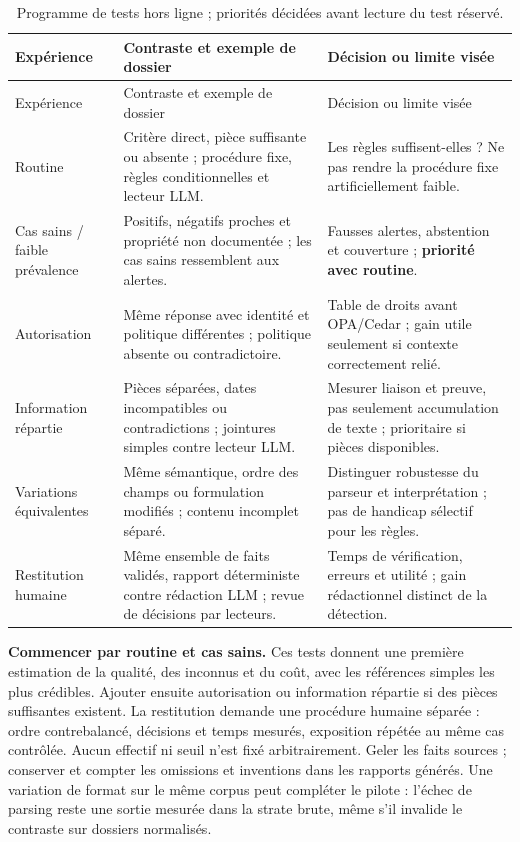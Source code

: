 \documentclass[11pt,a4paper]{article}
\begin{document}
\begin{longtable}{>{\raggedright\arraybackslash}p{25mm}>{\raggedright\arraybackslash}p{65mm}>{\raggedright\arraybackslash}p{52mm}}
\caption{Programme de tests hors ligne ; priorités décidées avant lecture du test réservé.}\label{tab:tests}\\
\toprule
Expérience & Contraste et exemple de dossier & Décision ou limite visée\\
\midrule\endfirsthead
\toprule Expérience & Contraste et exemple de dossier & Décision ou limite visée\\\midrule\endhead
Routine & Critère direct, pièce suffisante ou absente ; procédure fixe, règles conditionnelles et lecteur LLM. & Les règles suffisent-elles ? Ne pas rendre la procédure fixe artificiellement faible.\\
Cas sains / faible prévalence & Positifs, négatifs proches et propriété non documentée ; les cas sains ressemblent aux alertes. & Fausses alertes, abstention et couverture ; \textbf{priorité avec routine}.\\
Autorisation & Même réponse avec identité et politique différentes ; politique absente ou contradictoire. & Table de droits avant OPA/Cedar ; gain utile seulement si contexte correctement relié.\\
Information répartie & Pièces séparées, dates incompatibles ou contradictions ; jointures simples contre lecteur LLM. & Mesurer liaison et preuve, pas seulement accumulation de texte ; prioritaire si pièces disponibles.\\
Variations équivalentes & Même sémantique, ordre des champs ou formulation modifiés ; contenu incomplet séparé. & Distinguer robustesse du parseur et interprétation ; pas de handicap sélectif pour les règles.\\
Restitution humaine & Même ensemble de faits validés, rapport déterministe contre rédaction LLM ; revue de décisions par lecteurs. & Temps de vérification, erreurs et utilité ; gain rédactionnel distinct de la détection.\\
\bottomrule
\end{longtable}

\textbf{Commencer par routine et cas sains.} Ces tests donnent une première
estimation de la qualité, des inconnus et du coût, avec les références simples
les plus crédibles. Ajouter ensuite autorisation ou information répartie
si des pièces suffisantes existent. La restitution demande une procédure
humaine séparée : ordre contrebalancé, décisions et temps mesurés, exposition
répétée au même cas contrôlée. Aucun effectif ni seuil n'est fixé arbitrairement.
Geler les faits sources ; conserver et compter les omissions et inventions
dans les rapports générés. Une variation de format sur le même corpus peut
compléter le pilote : l'échec de parsing reste une sortie mesurée dans la
strate brute, même s'il invalide le contraste sur dossiers normalisés.
\end{document}
